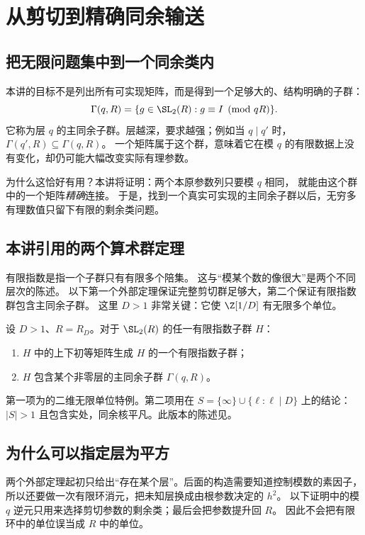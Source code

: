 \chapter{从剪切到精确同余输送}\label{ch:congruence}

\section{把无限问题集中到一个同余类内}
本讲的目标不是列出所有可实现矩阵，而是得到一个足够大的、结构明确的子群：
\[
\Gamma(q,R)=\{g\in\SL_2(R):g\equiv I\pmod{qR}\}.
\]
它称为层 $q$ 的主同余子群。层越深，要求越强；例如当 $q\mid q'$ 时，
$\Gamma(q',R)\subseteq\Gamma(q,R)$。
一个矩阵属于这个群，意味着它在模 $q$ 的有限数据上没有变化，却仍可能大幅改变实际有理参数。

为什么这恰好有用？本讲将证明：两个本原参数列只要模 $q$ 相同，
就能由这个群中的一个矩阵\emph{精确}连接。
于是，找到一个真实可实现的主同余子群以后，无穷多有理数值只留下有限的剩余类问题。

\section{本讲引用的两个算术群定理}
有限指数是指一个子群只有有限多个陪集。
这与“模某个数的像很大”是两个不同层次的陈述。
以下第一个外部定理保证完整剪切群足够大，第二个保证有限指数群包含主同余子群。
这里 $D>1$ 非常关键：它使 $\Z[1/D]$ 有无限多个单位。

\begin{theorem}\label{thm:arithmetic-external}
设 $D>1$、$R=R_D$。对于 $\SL_2(R)$ 的任一有限指数子群 $H$：
\begin{enumerate}
\item $H$ 中的上下初等矩阵生成 $H$ 的一个有限指数子群；
\item $H$ 包含某个非零层的主同余子群 $\Gamma(q,R)$。
\end{enumerate}
\end{theorem}
第一项为\cite[Theorem 6.1(2)]{morris}的二维无限单位特例。第二项用\cite{serre}在 $S=\{\infty\}\cup\{\ell:\ell\mid D\}$ 上的结论：$|S|>1$ 且包含实处，同余核平凡。此版本的陈述见\cite[pp.308--309, Proposition 1 and Section 2.3]{prasad}。


\section{为什么可以指定层为平方}
两个外部定理起初只给出“存在某个层”。后面的构造需要知道控制模数的素因子，
所以还要做一次有限环消元，把未知层换成由根参数决定的 $h^2$。
以下证明中的模 $q$ 逆元只用来选择剪切参数的剩余类；最后会把参数提升回 $R$。
因此不会把有限环中的单位误当成 $R$ 中的单位。

